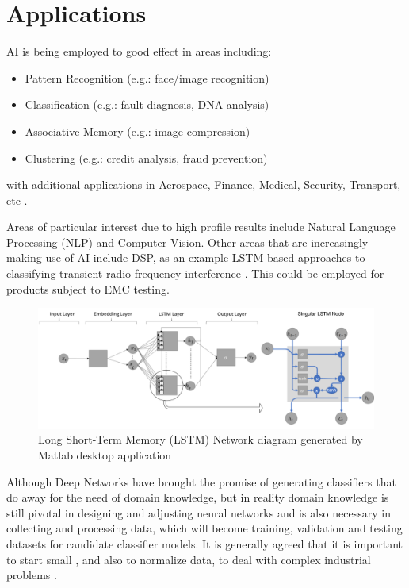 \section{Applications}

AI is being employed to good effect in areas including:

\begin{itemize}
    \item Pattern Recognition (e.g.: face/image recognition)
    \item Classification (e.g.: fault diagnosis, DNA analysis)
    \item Associative Memory (e.g.: image compression)
    \item Clustering (e.g.: credit analysis, fraud prevention)
\end{itemize}
with additional applications in Aerospace, Finance, Medical, Security, Transport, etc \cite{Garcez2019}.  

Areas of particular interest due to high profile results include Natural Language Processing (NLP) and Computer Vision. Other areas that are increasingly making use of AI include DSP, as an example LSTM-based approaches to classifying transient radio frequency interference \cite{Czech2018}. This could be employed for products subject to EMC testing.  

\begin{figure}[ht]
 \centering %
 \includegraphics[width=160mm]{images/LSTM.png}
 \caption{Long Short-Term Memory (LSTM) Network diagram generated by Matlab desktop application}
 \label{fig:sample}
\end{figure}

Although Deep Networks have brought the promise of generating classifiers that do away for the need of domain knowledge, but in reality domain knowledge is still pivotal in designing and adjusting neural networks and is also necessary in collecting and processing data, which will become training, validation and testing datasets for candidate classifier models. It is generally agreed that it is important to start small \cite{ELMAN199371}, and also to normalize data, to deal with complex industrial problems \cite{589532}.  
